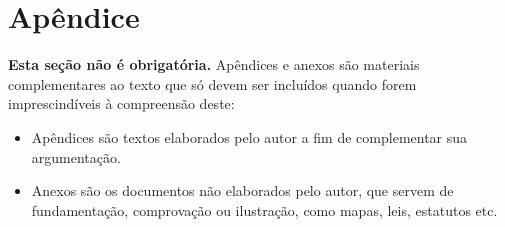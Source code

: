 \section*{Apêndice}

\textbf{Esta seção não é obrigatória.} Apêndices e anexos são materiais complementares ao texto que só devem ser incluídos quando forem imprescindíveis à compreensão deste:

\begin{itemize}
    \item Apêndices são textos elaborados pelo autor a fim de complementar sua argumentação.
    \item Anexos são os documentos não elaborados pelo autor, que servem de fundamentação, comprovação ou ilustração, como mapas, leis, estatutos etc.

\end{itemize}

